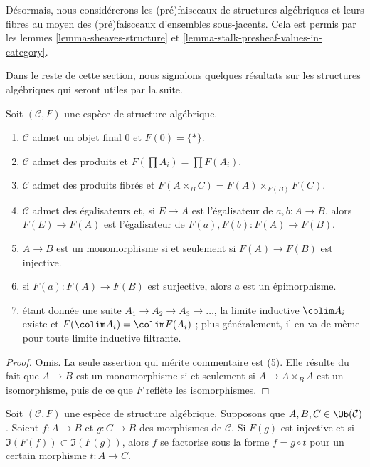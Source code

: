 \noindent
Désormais, nous considérerons les (pré)faisceaux de structures algébriques et
leurs fibres au moyen des (pré)faisceaux d'ensembles sous-jacents. Cela est
permis par les lemmes \ref{lemma-sheaves-structure} et
\ref{lemma-stalk-presheaf-values-in-category}.

\medskip\noindent
Dans le reste de cette section, nous signalons quelques résultats sur les
structures algébriques qui seront utiles par la suite.

\begin{lemma}
\label{lemma-properties-algebraic-structures}
Soit $(\mathcal{C}, F)$ une espèce de structure algébrique.
\begin{enumerate}
\item $\mathcal{C}$ admet un objet final $0$ et $F(0) = \{ * \}$.
\item $\mathcal{C}$ admet des produits et $F(\prod A_i) = \prod F(A_i)$.
\item $\mathcal{C}$ admet des produits fibrés et
$F(A \times_B C) = F(A)\times_{F(B)}F(C)$.
\item $\mathcal{C}$ admet des égalisateurs et, si $E \to A$ est
l'égalisateur de $a, b : A \to B$, alors $F(E) \to F(A)$ est l'égalisateur
de $F(a), F(b) : F(A) \to F(B)$.
\item $A \to B$ est un monomorphisme si et seulement si
$F(A) \to F(B)$ est injective.
\item si $F(a) : F(A) \to F(B)$ est surjective, alors $a$ est un
épimorphisme.
\item étant donnée une suite $A_1 \to A_2 \to A_3 \to \ldots$, la limite
inductive $\colim A_i$ existe et $F(\colim A_i) = \colim F(A_i)$ ; plus
généralement, il en va de même pour toute limite inductive filtrante.
\end{enumerate}
\end{lemma}

\begin{proof}
Omis. La seule assertion qui mérite commentaire est (5). Elle résulte du fait
que $A \to B$ est un monomorphisme si et seulement si
$A \to A \times_B A$ est un isomorphisme, puis de ce que $F$ reflète les
isomorphismes.
\end{proof}

\begin{lemma}
\label{lemma-image-contained-in}
Soit $(\mathcal{C}, F)$ une espèce de structure algébrique.
Supposons que $A, B, C \in \Ob(\mathcal{C})$.
Soient $f : A \to B$ et $g : C \to B$ des morphismes de $\mathcal{C}$.
Si $F(g)$ est injective et si $\Im(F(f)) \subset \Im(F(g))$, alors $f$ se
factorise sous la forme $f = g \circ t$ pour un certain morphisme
$t : A \to C$.
\end{lemma}

